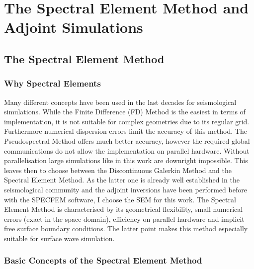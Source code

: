 
\chapter{The Spectral Element Method and Adjoint Simulations}


\section{The Spectral Element Method}

\subsection{Why Spectral Elements}

Many different concepts have been used in the last decades for seismological simulations. 
While the Finite Difference (FD) Method is the easiest in terms of implementation, it is not suitable for 
complex geometries due to its regular grid. %
Furthermore numerical dispersion errors limit the accuracy of this method.
The Pseudospectral Method offers much better accuracy, however the required global communications do not allow the 
implementation on parallel hardware. Without parallelisation large simulations like in this work are downright impossible.
This leaves then to choose between the Discontinuous Galerkin Method and the Spectral Element Method. As the latter one 
is already well established in the seismological community and the adjoint inversions have been performed before with the
SPECFEM software, I choose the SEM for this work. 
The Spectral Element Method is characterised by its geometrical flexibility, small numerical errors (exact in the space domain), 
efficiency on parallel hardware and implicit free surface boundary conditions. 
The latter point makes this method especially suitable for surface wave simulation. %

\subsection{Basic Concepts of the Spectral Element Method}

